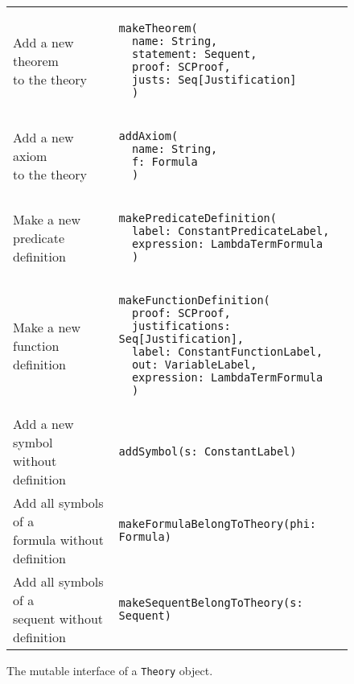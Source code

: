 {\begin{figure}[hp]
\begin{center}
\begin{tabular}{l|l}
          \makecell[l]{Add a new theorem    \\to the theory} &
          \begin{lstlisting}
makeTheorem(
  name: String,
  statement: Sequent,
  proof: SCProof,
  justs: Seq[Justification]
  )
\end{lstlisting}
          \\ %

          \makecell[l]{Add a new axiom      \\ to the theory} &
          \begin{lstlisting}
addAxiom(
  name: String,
  f: Formula
  )
\end{lstlisting}
          \\ %

          \makecell[l]{Make a new           \\predicate definition} &
          \begin{lstlisting}
makePredicateDefinition(
  label: ConstantPredicateLabel,
  expression: LambdaTermFormula
  )
\end{lstlisting}
          \\ %

          \makecell[l]{Make a new           \\function definition} &
          \begin{lstlisting}
makeFunctionDefinition(
  proof: SCProof,
  justifications: Seq[Justification],
  label: ConstantFunctionLabel,
  out: VariableLabel,
  expression: LambdaTermFormula
  )
\end{lstlisting}
          \\ %

          \makecell[l]{Add a new symbol     \\without definition} &
          \begin{lstlisting}
addSymbol(s: ConstantLabel)
\end{lstlisting}
          \\ %

          \makecell[l]{Add all symbols of a \\formula without definition} &
          \begin{lstlisting}
makeFormulaBelongToTheory(phi: Formula)
\end{lstlisting}
          \\ %

          \makecell[l]{Add all symbols of a \\sequent without definition} &
          \begin{lstlisting}
makeSequentBelongToTheory(s: Sequent)
\end{lstlisting}
          \\ %
        \end{tabular}
        \caption{The mutable interface of a \lstinline{Theory}{} object.}
        \label{fig:theorysetters}
      \end{center}
    \end{figure}



}
